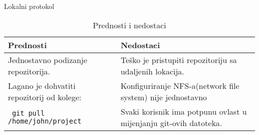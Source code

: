 \documentclass[10pt]{beamer}
\begin{document}
	\begin{frame}{Lokalni protokol}
		\begin{table}
			\caption{Prednosti i nedostaci}
			\begin{tabular}{||p{130pt}|p{130pt}||}
				\hline
				\textbf{Prednosti} & \textbf{Nedostaci} \\ \hline
				Jednostavno podizanje repozitorija. & Teško je pristupiti repozitoriju 	sa udaljenih lokacija. \\
				Lagano je dohvatiti repozitorij od kolege: & Konfiguriranje NFS-a(network file system) nije jednostavno\\ \texttt{ git pull /home/john/project}  & Svaki korisnik ima potpunu ovlast u mijenjanju git-ovih datoteka. \\
				\hline
			\end{tabular}
		\end{table}

	\end{frame}
\end{document}
